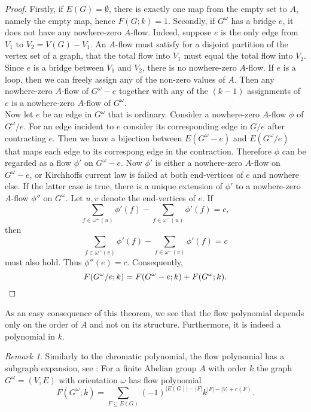 \documentclass[12pt,a4paper, twoside, autooneside=false]{scrartcl}
\theoremstyle{definition}
\theoremstyle{remark}
\newtheorem{remark}[theorem]{Remark}
\numberwithin{equation}{section}
\begin{document}
\begin{proof}
Firstly, if $E(G) = \emptyset$, there is exactly one map from the empty set to $A$, namely the empty map, hence $F(G;k) = 1$. Secondly, if $G^\omega$ has a bridge $e$, it does not have any nowhere-zero $A$-flow. Indeed, suppose $e$ is the only edge from $V_1$ to $V_2 = V(G) - V_1$. An $A$-flow must satisfy for a disjoint partition of the vertex set of a graph, that the total flow into $V_1$ must equal the total flow into $V_2$. Since $e$ is a bridge between $V_1$ and $V_2$, there is no nowhere-zero $A$-flow. If $e$ is a loop, then we can freely assign any of the non-zero values of $A$. Then any nowhere-zero $A$-flow of $G^\omega - e$ together with any of the $(k-1)$ assignments of $e$ is a nowhere-zero $A$-flow of $G^\omega$. \\ 
\indent Now let $e$ be an edge in $G^\omega$ that is ordinary. Consider a nowhere-zero $A$-flow $\phi$ of $G^\omega / e$. For an edge incident to $e$ consider its corresponding edge in $G / e$ after contracting $e$. Then we have a bijection between $E(G^\omega - e)$ and $E(G^\omega / e)$ that maps each edge to its correspong edge in the contraction. Therefore $\phi$ can be regarded as a flow $\phi'$ on $G^\omega - e$. Now $\phi'$ is either a nowhere-zero $A$-flow on $G^\omega - e$, or Kirchhoffs current law is failed at both end-vertices of $e$ and nowhere else. If the latter case is true, there is a unique extension of $\phi'$ to a nowhere-zero $A$-flow $\phi''$ on $G^\omega$. Let $u,v$ denote the end-vertices of $e$. If
\[
\sum\limits_{f \in \omega^+(u)} \phi'(f) - \sum\limits_{f \in \omega^-(u)} \phi'(f) = c,
\]
then 
\[
\sum\limits_{f \in \omega^+(v)} \phi'(f) - \sum\limits_{f \in \omega^-(v)} \phi'(f) = c
\]
must also hold. Thus $\phi''(e) = c$. Consequently, 
\[
F(G^\omega / e ;k) = F(G^\omega - e;k) + F(G^\omega; k). \qedhere
\]
\end{proof}
As an easy consequence of this theorem, we see that the flow polynomial depends only on the order of $A$ and not on its structure. Furthermore, it is indeed a polynomial in $k$.
\begin{remark}
Similarly to the chromatic polynomial, the flow polynomial has a subgraph expansion, see \cite{ElMo2022}: For a finite Abelian group $A$ with order $k$ the graph $G^\omega = (V,E)$ with orientation $\omega$ has flow polynomial 
\[
F(G^\omega; k) = \sum_{F \subseteq E(G)}(-1)^{|E(G)|- |F|} k^{|F| - |V| + c(F)}.
\]
\end{remark}
\end{document}

